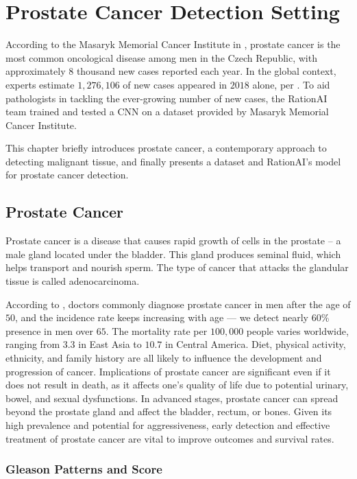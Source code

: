 \chapter{Prostate Cancer Detection Setting}

According to the Masaryk Memorial Cancer Institute in \cite{mmci-prostate-cancer}, prostate cancer is the most common oncological disease among men in the Czech Republic, with approximately $8$ thousand new cases reported each year.
In the global context, experts estimate $1,276,106$ of new cases appeared in $2018$ alone, per \cite{world-prostate-cancer}.
To aid pathologists in tackling the ever-growing number of new cases, the RationAI team trained and tested a CNN on a dataset provided by Masaryk Memorial Cancer Institute.

This chapter briefly introduces prostate cancer, a contemporary approach to detecting malignant tissue, and finally presents a dataset and RationAI's model for prostate cancer detection.

\section{Prostate Cancer}

Prostate cancer is a disease that causes rapid growth of cells in the prostate -- a male gland located under the bladder.
This gland produces seminal fluid, which helps transport and nourish sperm.
The type of cancer that attacks the glandular tissue is called adenocarcinoma.

According to \cite{world-prostate-cancer}, doctors commonly diagnose prostate cancer in men after the age of $50$, and the incidence rate keeps increasing with age --- we detect nearly $60$\% presence in men over $65$.
The mortality rate per $100,000$ people varies worldwide, ranging from $3.3$ in East Asia to $10.7$ in Central America. Diet, physical activity, ethnicity, and family history are all likely to influence the development and progression of cancer.
Implications of prostate cancer are significant even if it does not result in death, as it affects one's quality of life due to potential urinary, bowel, and sexual dysfunctions.
In advanced stages, prostate cancer can spread beyond the prostate gland and affect the bladder, rectum, or bones.
Given its high prevalence and potential for aggressiveness, early detection and effective treatment of prostate cancer are vital to improve outcomes and survival rates.

\subsection*{Gleason Patterns and Score}


